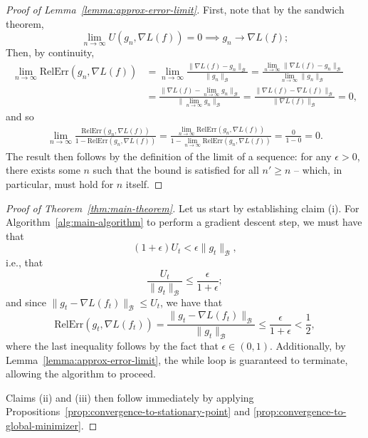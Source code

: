 \documentclass{article}
\newcommand{\B}{\mathcal{B}}
\newcommand{\RelErr}{\mathrm{RelErr}}
\begin{document}
\begin{proof}[Proof of Lemma~\ref{lemma:approx-error-limit}]
    First, note that by the sandwich theorem,
    \[ \lim_{n\to\infty} U(g_n, \nabla L(f)) = 0 \implies g_n \to \nabla L(f); \]
    Then, by continuity,
    \begin{align*}
        \lim_{n \to \infty} \RelErr(g_n, \nabla L(f))
        &= \lim_{n \to \infty} \frac{\lVert \nabla L(f) - g_n \rVert_\B}{\lVert g_n \rVert_\B}
        = \frac{\lim_{n \to \infty} \lVert \nabla L(f) - g_n \rVert_\B}{\lim_{n \to \infty} \lVert g_n \rVert_\B}
        \\ &= \frac{\lVert \nabla L(f) - \lim_{n \to \infty} g_n \rVert_\B}{\lVert \lim_{n \to \infty} g_n \rVert_\B}
        = \frac{\lVert \nabla L(f) - \nabla L(f) \rVert_\B}{\lVert \nabla L(f) \rVert_\B}
        = 0,
    \end{align*}
    and so
    \begin{align*}
        \lim_{n \to \infty} \frac{\RelErr(g_n, \nabla L(f))}{1 - \RelErr(g_n, \nabla L(f))}
        = \frac{\lim_{n \to \infty} \RelErr(g_n, \nabla L(f))}{1 - \lim_{n \to \infty} \RelErr(g_n, \nabla L(f))}
        = \frac{0}{1 - 0} = 0.
    \end{align*}
    The result then follows by the definition of the limit of a sequence: for any $\epsilon > 0$, there exists some $n$ such that the bound is satisfied for all $n' \geq n$ -- which, in particular, must hold for $n$ itself.
\end{proof}

\begin{proof}[Proof of Theorem~\ref{thm:main-theorem}]
    Let us start by establishing claim (i).
    For Algorithm~\ref{alg:main-algorithm} to perform a gradient descent step, we must have that
    \[ (1 + \epsilon) U_t < \epsilon \lVert g_t \rVert_\B, \]
    i.e., that
    \[ \frac{U_t}{\lVert g_t \rVert_\B} \leq \frac{\epsilon}{1+\epsilon}; \]
    and since $\lVert g_t - \nabla L(f_t) \rVert_\B \leq U_t$, we have that
    \[ \RelErr(g_t, \nabla L(f_t)) = \frac{\lVert g_t - \nabla L(f_t) \rVert_\B}{\lVert g_t \rVert_\B} \leq \frac{\epsilon}{1+\epsilon} < \frac{1}{2}, \]
    where the last inequality follows by the fact that $\epsilon \in (0, 1)$.
    Additionally, by Lemma~\ref{lemma:approx-error-limit}, the while loop is guaranteed to terminate, allowing the algorithm to proceed.

    Claims (ii) and (iii) then follow immediately by applying Propositions~\ref{prop:convergence-to-stationary-point} and \ref{prop:convergence-to-global-minimizer}.
\end{proof}
\end{document}
